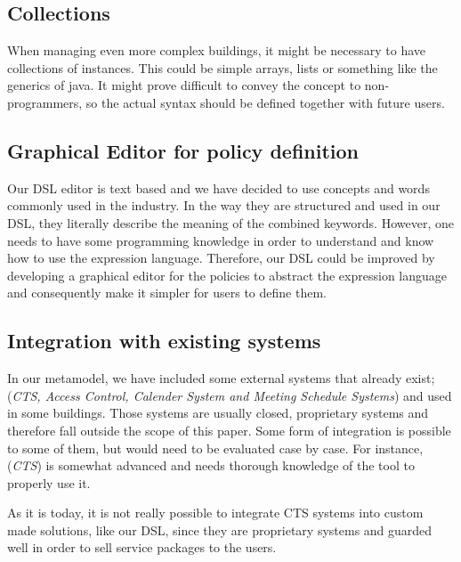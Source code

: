 \subsection{Collections}\label{subsec:collections}
When managing even more complex buildings, it might be necessary to have collections of instances. This could be simple arrays, lists or something like the generics of java. It might prove difficult to convey the concept to non-programmers, so the actual syntax should be defined together with future users.

\subsection{Graphical Editor for policy definition}\label{subsec:graphicaleditor}
Our DSL editor is text based and we have decided to use concepts and words commonly used in the industry. In the way they are structured and used in our DSL, they literally describe the meaning of the combined keywords. However, one needs to have some programming knowledge in order to understand and know how to use the expression language. Therefore, our DSL could be improved by developing a graphical editor for the policies to abstract the expression language and consequently make it simpler for users to define them.

\subsection{Integration with existing systems}\label{subsec:integration}
In our metamodel, we have included some external systems that already exist; (\textit{CTS, Access Control, Calender System and Meeting Schedule Systems}) and used in some buildings. Those systems are usually closed, proprietary systems and therefore fall outside the scope of this paper. Some form of integration is possible to some of them, but would need to be evaluated case by case. For instance, (\textit{CTS}) is somewhat advanced and needs thorough knowledge of the tool to properly use it. 
\begin{comment}The GUI looks like an electrical diagram, and is not made for ease of use. Moreover, the temperatures shown in the program are from sensors in the ventilation ducts, not in the room themselves, adding extra complexity. 
\end{comment}
As it is today, it is not really possible to integrate CTS systems into custom made solutions, like our DSL, since they are proprietary systems and guarded well in order to sell service packages to the users.

